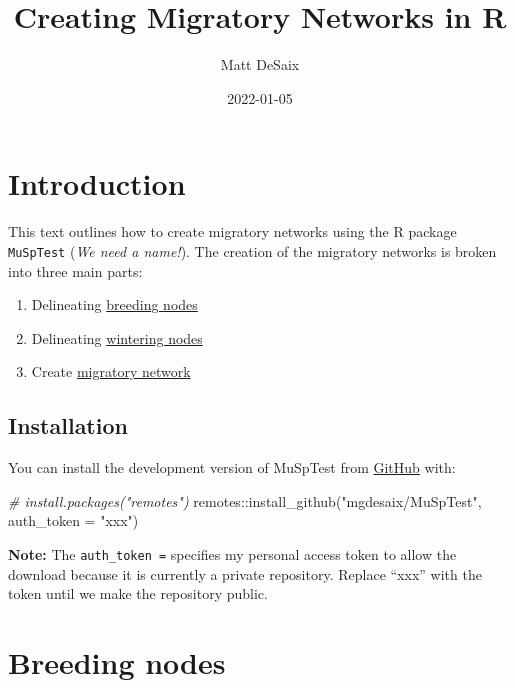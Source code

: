 \documentclass[
]{book}
\title{Creating Migratory Networks in R}
\author{Matt DeSaix}
\date{2022-01-05}
\newenvironment{Shaded}{\begin{snugshade}}{\end{snugshade}}
\newcommand{\AttributeTok}[1]{\textcolor[rgb]{0.77,0.63,0.00}{#1}}
\newcommand{\CommentTok}[1]{\textcolor[rgb]{0.56,0.35,0.01}{\textit{#1}}}
\newcommand{\FunctionTok}[1]{\textcolor[rgb]{0.00,0.00,0.00}{#1}}
\newcommand{\NormalTok}[1]{#1}
\newcommand{\SpecialCharTok}[1]{\textcolor[rgb]{0.00,0.00,0.00}{#1}}
\newcommand{\StringTok}[1]{\textcolor[rgb]{0.31,0.60,0.02}{#1}}
\providecommand{\tightlist}{%
  \setlength{\itemsep}{0pt}\setlength{\parskip}{0pt}}
\begin{document}
\maketitle

{
\setcounter{tocdepth}{1}
\tableofcontents
}
\hypertarget{introduction}{%
\chapter{Introduction}\label{introduction}}

This text outlines how to create migratory networks using the R package \texttt{MuSpTest} (\emph{We need a name!}). The creation of the migratory networks is broken into three main parts:

\begin{enumerate}
\def\labelenumi{\arabic{enumi}.}
\tightlist
\item
  Delineating \protect\hyperlink{breeding}{breeding nodes}
\item
  Delineating \protect\hyperlink{wintering}{wintering nodes}
\item
  Create \protect\hyperlink{connectivity}{migratory network}
\end{enumerate}

\hypertarget{installation}{%
\section{Installation}\label{installation}}

You can install the development version of MuSpTest from \href{https://github.com/}{GitHub} with:

\begin{Shaded}
\begin{Highlighting}[]
\CommentTok{\# install.packages("remotes")}
\NormalTok{remotes}\SpecialCharTok{::}\FunctionTok{install\_github}\NormalTok{(}\StringTok{"mgdesaix/MuSpTest"}\NormalTok{, }\AttributeTok{auth\_token =} \StringTok{"xxx"}\NormalTok{)}
\end{Highlighting}
\end{Shaded}

\textbf{Note:} The \texttt{auth\_token\ =} specifies my personal access token to allow the download because it is currently a private repository. Replace ``xxx'' with the token until we make the repository public.

\hypertarget{breeding}{%
\chapter{Breeding nodes}\label{breeding}}
\end{document}
